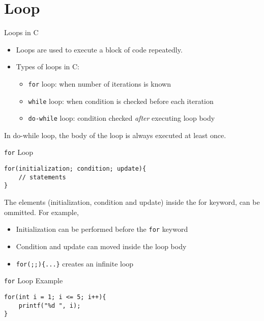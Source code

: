 \documentclass[12pt, aspectratio=169]{beamer}
\begin{document}
    \section{Loop}

    \begin{frame}{Loops in C}
        \begin{itemize}
            \item Loops are used to execute a block of code repeatedly.
            \item Types of loops in C:
            \begin{itemize}
                \item \texttt{for} loop: when number of iterations is known
                \item \texttt{while} loop: when condition is checked before each iteration
                \item \texttt{do-while} loop: condition checked \textit{after} executing loop body
            \end{itemize}
        \end{itemize}

        In do-while loop, the body of the loop is always executed at least once.
    \end{frame}


    \begin{frame}[fragile]{\texttt{for} Loop}
\begin{verbatim}
for(initialization; condition; update){
    // statements
}
        \end{verbatim}

        The elements (initialization, condition and update) inside the for keyword, can be ommitted. For example,
        \begin{itemize}
            \item Initialization can be performed before the \texttt{for} keyword
            \item Condition and update can moved inside the loop body
            \item \texttt{for(;;)\{...\}} creates an infinite loop
        \end{itemize}
    \end{frame}


    \begin{frame}[fragile]{\texttt{for} Loop Example}
        \begin{verbatim}
for(int i = 1; i <= 5; i++){
    printf("%d ", i);
}
        \end{verbatim}
    \end{frame}
\end{document}
